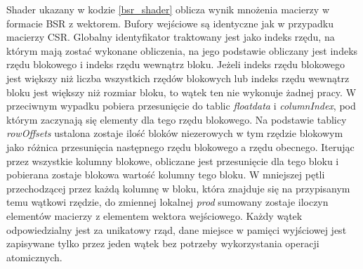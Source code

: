 Shader ukazany w kodzie \ref{bsr_shader} oblicza wynik mnożenia macierzy w formacie BSR z wektorem.
Bufory wejściowe są identyczne jak w przypadku macierzy CSR.
Globalny identyfikator traktowany jest jako indeks rzędu, na którym mają zostać wykonane obliczenia, na jego podstawie obliczany jest indeks rzędu blokowego i indeks rzędu wewnątrz bloku.
Jeżeli indeks rzędu blokowego jest większy niż liczba wszystkich rzędów blokowych lub indeks rzędu wewnątrz bloku jest większy niż rozmiar bloku, to wątek ten nie wykonuje żadnej pracy.
W przeciwnym wypadku pobiera przesunięcie do tablic \textit{floatdata} i \textit{columnIndex}, pod którym zaczynają się elementy dla tego rzędu blokowego.
Na podstawie tablicy \textit{rowOffsets} ustalona zostaje ilość bloków niezerowych w tym rzędzie blokowym jako różnica przesunięcia następnego rzędu blokowego a rzędu obecnego.
Iterując przez wszystkie kolumny blokowe, obliczane jest przesunięcie dla tego bloku i pobierana zostaje blokowa wartość kolumny tego bloku.
W mniejszej pętli przechodzącej przez każdą kolumnę w bloku, która znajduje się na przypisanym temu wątkowi rzędzie, do zmiennej lokalnej \textit{prod} sumowany zostaje iloczyn elementów macierzy z elementem wektora wejściowego.
Każdy wątek odpowiedzialny jest za unikatowy rząd, dane miejsce w pamięci wyjściowej jest zapisywane tylko przez jeden wątek bez potrzeby wykorzystania operacji atomicznych.
